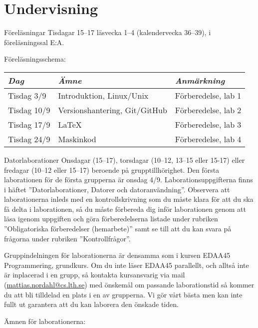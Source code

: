 \documentclass[a4paper]{memoir}
\begin{document}
\clearpage
\section*{Undervisning}

\begin{Items}
    \item[Föreläsningar]
    Tisdagar 15--17 läsvecka 1--4 (kalendervecka 36--39), i föreläsningssal E:A.

    Föreläsningsschema:

    {\hspace{0.5cm}
    \begin{tabular}{lll}
        \emph{Dag}  & \emph{Ämne}                   & \emph{Anmärkning}   \\ \midrule
        Tisdag 3/9  & Introduktion, Linux/Unix      & Förberedelse, lab 1 \\
        Tisdag 10/9 & Versionshantering, Git/GitHub & Förberedelse, lab 2 \\
        Tisdag 17/9 & \LaTeX                        & Förberedelse, lab 3 \\
        Tisdag 24/9 & Maskinkod                     & Förberedelse, lab 4 \\
    \end{tabular}
    }

    \item[Datorlaborationer]
    Onsdagar (15--17), torsdagar (10--12, 13--15 eller 15-17) eller fredagar (10--12 eller 15--17) beroende på grupptillhörighet. Den första laborationen för de första grupperna är onsdag 4/9. Laborationsuppgifterna finns i häftet ''Datorlaborationer, Datorer och datoranvändning''. Observera att laborationerna inleds med en kontrollskrivning som du måste klara för att du ska få delta i laborationen, så du måste förbereda dig inför laborationen genom att läsa igenom uppgiften och göra förberedelserna listade under rubriken ''Obligatoriska förberedelser (hemarbete)'' samt se till att du kan svara på frågorna under rubriken ''Kontrollfrågor''.

    Gruppindelningen för laborationerna är densamma som i kursen EDAA45 Programmering, grundkurs. Om du inte läser EDAA45 parallellt, och alltså inte är inplacerad i en grupp, så kontakta kursansvarig via mail (\url{mattias.nordahl@cs.lth.se}) med önskemål om passande laborationstid så kommer du att bli tilldelad en plats i en av grupperna. Vi gör vårt bästa men kan inte fullt ut garantera att du kan laborera den önskade tiden.

    Ämnen för laborationerna:


\end{Items}
\end{document}
